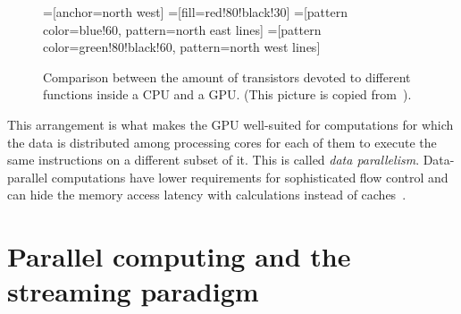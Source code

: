 \begin{figure}
  \centering
  =[anchor=north west]
  =[fill=red!80!black!30]
  =[pattern color=blue!60, pattern=north east lines]
  =[pattern color=green!80!black!60, pattern=north west lines]
  \label{fig:transistors}
  \caption[Comparison between CPU and GPU layout]{
    Comparison between the amount of transistors
    devoted to different functions inside a CPU and a GPU.
    (This picture is copied from~\cite[\S1]{cudaprog2}).
  }
\end{figure}

This arrangement is what makes the GPU
well-suited for computations
for which the data is distributed among processing cores
for each of them to execute the same instructions
on a different subset of it.
This is called \emph{data parallelism}.
Data-parallel computations have lower requirements
for sophisticated flow control
and can hide the memory access latency with calculations
instead of caches~\cite[\S1.2]{cudaprog2}.

\section{Parallel computing and the streaming paradigm}



